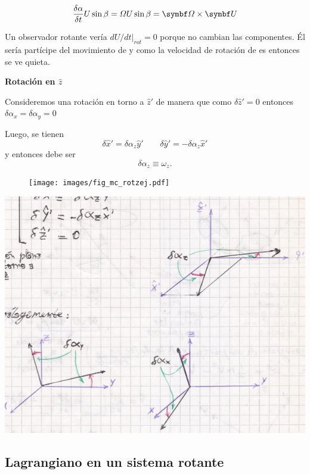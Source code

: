 \documentclass[10pt,oneside]{CBFT_book}
\begin{document}
\[
	\frac{\delta \alpha}{\delta t} U \sin \beta = \Omega U \sin \beta = \vb{\Omega} \times \vb{U}
\]

Un observador rotante vería $dU/dt|_{rot} = 0$ porque no cambian las componentes. Él sería partícipe del movimiento de  y 
como la velocidad de rotación de  es \vb{\Omega} entonces  se ve quieta.

\begin{ejemplo}{\bf Rotación en $\hat{z}$}

Consideremos una rotación en torno a $\hat{z}'$ de manera que como $\delta\hat{z}'=0$ entonces  
$\delta\alpha_x=\delta\alpha_y=0$

Luego, se tienen 
\[
	\delta\hat{x}' = \delta\alpha_z \hat{y}' \qquad \delta\hat{y}' = - \delta\alpha_z \hat{x}'
\]
y entonces debe ser
\[
	\delta \alpha_z \equiv \omega_z . 
\]
\begin{figure}[htb]
	\begin{center}
	\texttt{[image: images/fig\_mc\_rotzej.pdf]}	 
	\end{center}
	\caption{}
\end{figure} 

\includegraphics[scale=0.4]{images/fig_mc_rotaciones_ej_rotz.jpg}

\end{ejemplo}


\subsection{Lagrangiano en un sistema rotante}
\end{document}
